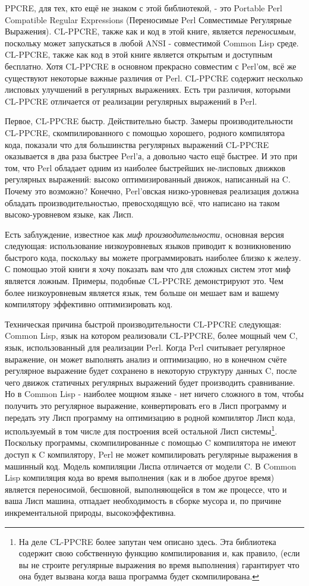 PPCRE, для тех, кто ещё не знаком с этой библиотекой, - это Portable Perl Compatible Regular Expressions (Переносимые Perl Совместимые Регулярные Выражения). CL-PPCRE, также как и код в этой книге, является \emph{переносимым}, поскольку может запускаться в любой ANSI - совместимой Common Lisp среде. CL-PPCRE, также как код в этой книге является открытым и доступным бесплатно. Хотя CL-PPCRE в основном прекрасно совместим с Perl'ом, всё же существуют некоторые важные различия от Perl. CL-PPCRE содержит несколько лисповых улучшений в регулярных выражениях. Есть три различия, которыми CL-PPCRE отличается от реализации регулярных выражений в Perl.

Первое, CL-PPCRE быстр. Действительно быстр. Замеры производительности CL-PPCRE, скомпилированного с помощью хорошего, родного компилятора кода, показали что для большинства регулярных выражений CL-PPCRE оказывается в два раза быстрее Perl'а, а довольно часто ещё быстрее. И это при том, что Perl обладает одним из наиболее быстрейших не-лисповых движков регулярных выражений: высоко оптимизированный движок, написанный на C. Почему это возможно? Конечно, Perl'овская низко-уровневая реализация должна обладать производительностью, превосходящую всё, что написано на таком высоко-уровневом языке, как Лисп.

Есть заблуждение, известное как \emph{миф производительности}, основная версия следующая: использование низкоуровневых языков приводит к возникновению быстрого кода, поскольку вы можете программировать наиболее близко к железу. С помощью этой книги я хочу показать вам что для сложных систем этот миф является ложным. Примеры, подобные CL-PPCRE демонстрируют это. Чем более низкоуровневым является язык, тем больше он мешает вам и вашему компилятору эффективно оптимизировать код.

Техническая причина быстрой производительности CL-PPCRE следующая: Common Lisp, язык на котором реализовали CL-PPCRE, более мощный чем C, язык, использованный для реализации Perl. Когда Perl считывает регулярное выражение, он может выполнять анализ и оптимизацию, но в конечном счёте регулярное выражение будет сохранено в некоторую структуру данных C, после чего движок статичных регулярных выражений будет производить сравнивание. Но в Common Lisp - наиболее мощном языке - нет ничего сложного в том, чтобы получить это регулярное выражение, конвертировать его в Лисп программу и передать эту Лисп программу на оптимизацию в родной компилятор Лисп кода, используемый в том числе для построения всей остальной Лисп системы\footnote{На деле CL-PPCRE более запутан чем описано здесь. Эта библиотека содержит свою собственную функцию компилирования и, как правило, (если вы не строите регулярные выражения во время выполнения) гарантирует что она будет вызвана когда ваша программа будет скомпилирована.}. Поскольку программы, скомпилированные с помощью C компилятора не имеют доступ к C компилятору, Perl не может компилировать регулярные выражения в машинный код. Модель компиляции Лиспа отличается от модели C. В Common Lisp компиляция кода во время выполнения (как и в любое другое время) является переносимой, бесшовной, выполняющейся в том же процессе, что и ваша Лисп машина, отпадает необходимость в сборке мусора и, по причине инкрементальной природы, высокоэффективна.

